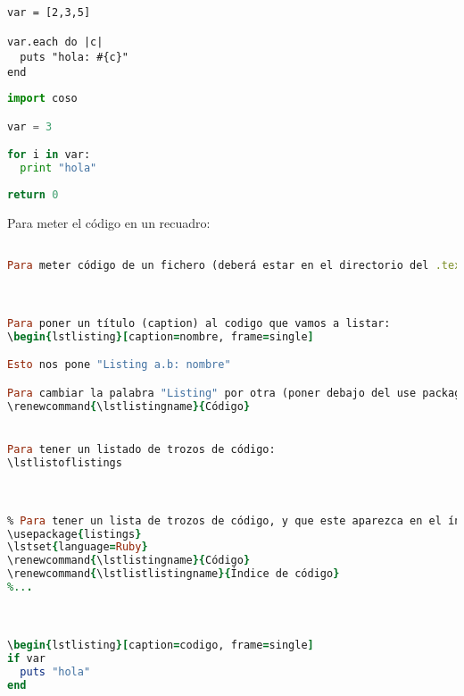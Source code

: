 
\begin{lstlisting}[caption=nombre, frame=single]
\end{lstlisting}


\usepackage{listings}
\lstset{language=Ruby} %

\begin{lstlisting}
var = [2,3,5]

var.each do |c|
  puts "hola: #{c}"
end
\end{lstlisting}

\begin{lstlisting}[language=Python]
import coso

var = 3

for i in var:
  print "hola"
  
return 0
\end{lstlisting}


Para meter el código en un recuadro:
\begin{lstlisting}[language=Ruby,frame=single]

Para meter código de un fichero (deberá estar en el directorio del .tex):



Para poner un título (caption) al codigo que vamos a listar:
\begin{lstlisting}[caption=nombre, frame=single]

Esto nos pone "Listing a.b: nombre"

Para cambiar la palabra "Listing" por otra (poner debajo del use package):
\renewcommand{\lstlistingname}{Código}


Para tener un listado de trozos de código:
\lstlistoflistings



% Para tener un lista de trozos de código, y que este aparezca en el índice, deberíamos tener:
\usepackage{listings}
\lstset{language=Ruby}
\renewcommand{\lstlistingname}{Código}
\renewcommand{\lstlistlistingname}{Índice de código}
%...



\begin{lstlisting}[caption=codigo, frame=single]
if var
  puts "hola"
end
\end{lstlisting}

\lstlistoflistings

